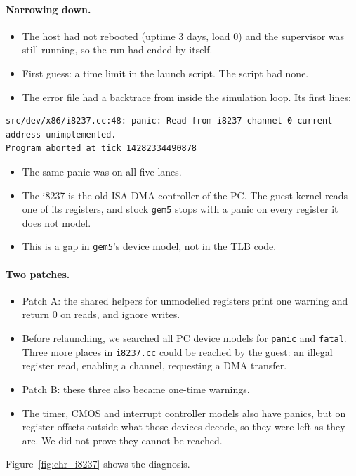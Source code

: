 \paragraph{Narrowing down.}
\begin{itemize}
    \item The host had not rebooted (uptime 3 days, load 0) and the supervisor was still running, so the run had ended by itself.
    \item First guess: a time limit in the launch script. The script had none.
    \item The error file had a backtrace from inside the simulation loop. Its first lines:
\end{itemize}
\begin{lstlisting}
src/dev/x86/i8237.cc:48: panic: Read from i8237 channel 0 current address unimplemented.
Program aborted at tick 14282334490878
\end{lstlisting}
\begin{itemize}
    \item The same panic was on all five lanes.
    \item The i8237 is the old ISA DMA controller of the PC. The guest kernel reads one of its registers, and stock \texttt{gem5} stops with a panic on every register it does not model.
    \item This is a gap in \texttt{gem5}'s device model, not in the TLB code.
\end{itemize}

\paragraph{Two patches.}
\begin{itemize}
    \item Patch A: the shared helpers for unmodelled registers print one warning and return 0 on reads, and ignore writes.
    \item Before relaunching, we searched all PC device models for \texttt{panic} and \texttt{fatal}. Three more places in \texttt{i8237.cc} could be reached by the guest: an illegal register read, enabling a channel, requesting a DMA transfer.
    \item Patch B: these three also became one-time warnings.
    \item The timer, CMOS and interrupt controller models also have panics, but on register offsets outside what those devices decode, so they were left as they are. We did not prove they cannot be reached.
\end{itemize}
Figure~\ref{fig:chr_i8237} shows the diagnosis.


